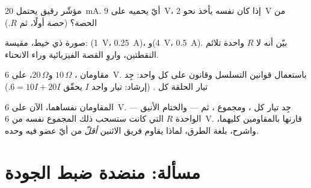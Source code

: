 \begin{exercise}[$\star\star$]\label{exo:g8:ohms-law:9}
 مؤشّر رقيق يحتمل \qty{20}{mA}. أيّ  
يحميه على  \qty{9}{V}، إذا كان  نفسه يأخذ نحو
\qty{2}{V} من الحصة؟ (حصة  أولًا، ثم $R$.)
\end{exercise}

\begin{exercise}[$\star\star$]\label{exo:g8:ohms-law:10}
صورة  ذي خيط، مقيسة: (\qty{1}{V}، \qty{0.25}{A})،
و(\qty{4}{V}، \qty{0.5}{A}). بيّن أنه لا $R$ واحدة تلائم
النقطتين، واروِ القصة الفيزيائية وراء الانحناء.
\end{exercise}

\begin{exercise}[$\star\star$]\label{exo:g8:ohms-law:11}
مقاومان ، $10\,\Omega$ و$20\,\Omega$، على
\qty{6}{V}. باستعمال قوانين التسلسل وقانون  على كل واحد:
جِد تيار الحلقة  كل . (إرشاد: تيار واحد $I$ يحقّق
$6 = 10 I + 20 I$.)
\end{exercise}

\begin{exercise}[$\star\star\star$]\label{exo:g8:ohms-law:12}
المقاومان نفساهما،  الآن على \qty{6}{V}. جِد تيار كل
، ومجموع ، ثم --- والختام الأنيق --- 
الواحدة $R$ التي كانت ستسحب ذلك المجموع نفسه من \qty{6}{V}.
قارنها بالمقاومين كليهما، واشرح، بلغة الطرق، لماذا يقاوم فريق
الاثنين \emph{أقلّ} من أيّ عضو فيه وحده.
\end{exercise}

\section{مسألة: منضدة ضبط الجودة}


